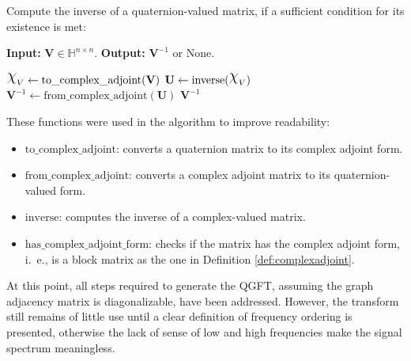 \newcommand{\algorithmspacing}{0.5}
\begin{algorithm}
\label{alg:qinv}
Compute the inverse of a quaternion-valued matrix, if a sufficient condition for its existence is met:
\vspace*{-\algorithmspacing\baselineskip}
\begin{leftbar}
\noindent\textbf{\upshape Input:} $\mathbf{V} \in \mathbb{H}^{n \times n}$. \textbf{\upshape Output:} $\mathbf{V}^{-1}$ or {\upshape None}.

\begin{algorithmic}[1]
\State $\rchi_V \gets \mathrm{to\_complex\_adjoint}(\mathbf{V})$
    \State {}
\Else
    \State $\mathbf{U} \gets \mathrm{inverse}(\rchi_V)$
        \State {}
    \Else
        \State $\mathbf{V}^{-1} \gets \mathrm{from\_complex\_adjoint}(\mathbf{U})$
        \State \Return $\mathbf{V}^{-1}$
    \EndIf
\EndIf
\end{algorithmic}
\end{leftbar}
\vspace*{-\algorithmspacing\baselineskip}
\noindent These functions were used in the algorithm to improve readability:
\vspace*{-\algorithmspacing\baselineskip}
\begin{itemize}[noitemsep]
\item $\mathrm{to\_complex\_adjoint}$: converts a quaternion matrix to its complex adjoint form.
\item $\mathrm{from\_complex\_adjoint}$: converts a complex adjoint matrix to its quaternion-valued form.
\item $\mathrm{inverse}$: computes the inverse of a complex-valued matrix.
\item $\mathrm{has\_complex\_adjoint\_form}$: checks if the matrix has the complex adjoint form, i.~e., is a block matrix as the one in Definition \ref{def:complexadjoint}.
\end{itemize}
\end{algorithm}

At this point, all steps required to generate the QGFT, assuming the graph adjacency matrix is diagonalizable, have been addressed. However, the transform still remains of little use until a clear definition of frequency ordering is presented, otherwise the lack of sense of low and high frequencies make the signal spectrum meaningless.

